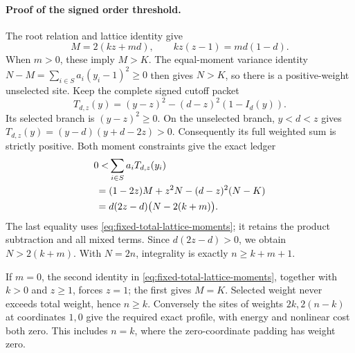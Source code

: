 \paragraph{Proof of the signed order threshold.}
The root relation and lattice identity give
\begin{equation}
 M=2(kz+md),\qquad kz(z-1)=md(1-d).
 \label{eq:fixed-total-lattice-moments}
\end{equation}
When \(m>0\), these imply \(M>K\).  The equal-moment variance identity
\(N-M=\sum_{i\in S}a_i(y_i-1)^2\ge0\) then gives \(N>K\),
so there is a positive-weight unselected site.  Keep the complete signed
cutoff packet
\[
 T_{d,z}(y)=(y-z)^2-(d-z)^2(1-I_d(y)).
\]
Its selected branch is \((y-z)^2\ge0\).  On the unselected branch,
\(y<d<z\) gives
\(T_{d,z}(y)=(y-d)(y+d-2z)>0\).
Consequently its full weighted sum is strictly positive.  Both moment
constraints give the exact ledger
\begin{align}
 0<&\sum_{i\in S}a_i T_{d,z}(y_i)\notag\\
  ={}&(1-2z)M+z^2N-(d-z)^2(N-K)\notag\\
  ={}&d(2z-d)\bigl(N-2(k+m)\bigr).
 \label{eq:fixed-total-energy-signed-order}
\end{align}
The last equality uses \eqref{eq:fixed-total-lattice-moments}; it retains
the product subtraction and all mixed terms.  Since \(d(2z-d)>0\),
we obtain \(N>2(k+m)\).  With \(N=2n\), integrality is exactly
\(n\ge k+m+1\).

If \(m=0\), the second identity in
\eqref{eq:fixed-total-lattice-moments}, together with \(k>0\) and
\(z\ge1\), forces \(z=1\); the first gives \(M=K\).
Selected weight never exceeds total weight, hence \(n\ge k\).
Conversely the sites of weights \(2k,2(n-k)\) at coordinates \(1,0\)
give the required exact profile, with energy and nonlinear cost both zero.
This includes \(n=k\), where the zero-coordinate padding has weight zero.

